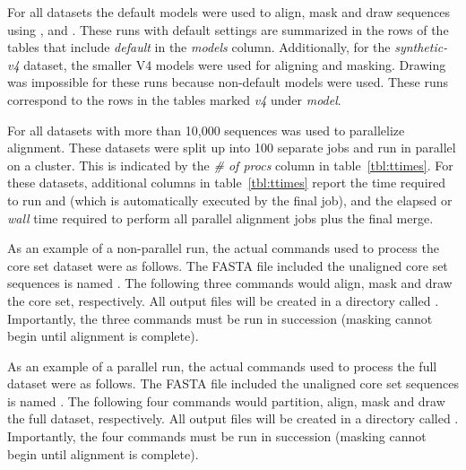 For all datasets the default models were used to align, mask and draw
sequences using ,  and
. These runs with default settings are summarized in the
rows of the tables that include \emph{default} in the \emph{models} column.
Additionally, for the \emph{synthetic-v4} dataset, the smaller V4
models were used for aligning and masking. Drawing was impossible for
these runs because non-default models were used. These runs correspond
to the rows in the tables marked \emph{v4} under \emph{model}.

For all datasets with more than 10,000 sequences  was
used to parallelize alignment. These datasets were split up into 100
separate jobs and run in parallel on a cluster. This is indicated by
the \emph{\# of procs} column in table~\ref{tbl:ttimes}.
For these datasets, additional columns in table~\ref{tbl:ttimes}
report the time required to run  and 
(which is automatically executed by the final  job),
and the elapsed or \emph{wall} time required to perform all parallel
alignment jobs plus the final merge.


As an example of a non-parallel run, the actual commands used to process the
 core set dataset were as follows. The FASTA file
included the unaligned core set sequences is named . The
following three commands would align, mask and draw the core
set, respectively. All output files will be created in a directory called
. Importantly, the three commands  must be run in succession
(masking cannot begin until alignment is complete). 




As an example of a parallel run, the actual commands used to process the
 full dataset were as follows. The FASTA file
included the unaligned core set sequences is named . The
following four commands would partition, align, mask and draw the full
dataset, respectively. All output files will be created in a directory
called . Importantly, the four commands must be run in succession
(masking cannot begin until alignment is complete). 

